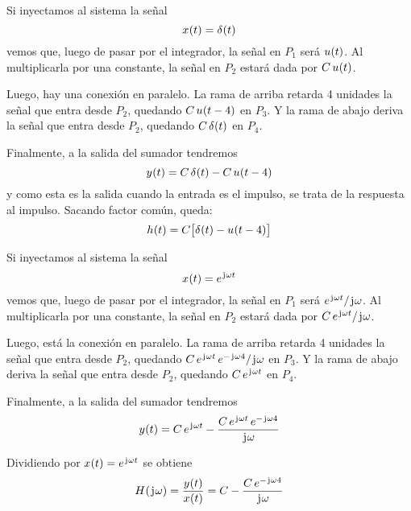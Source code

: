 \begin{mdframed}[style=ExampleFrame]
    \begin{center}
        \def\svgwidth{\linewidth}
        
    \end{center}


    Si inyectamos al sistema la señal
    \[
        \fx[x]{t} = \fx[\delta]{t}
    \]
    vemos que, luego de pasar por el integrador, la señal en $P_1$ será $\fx[u]{t}$.
    Al multiplicarla por una constante, la señal en $P_2$ estará dada por $C \, \fx[u]{t}$.

    Luego, hay una conexión en paralelo.
    La rama de arriba retarda 4 unidades la señal que entra desde $P_2$, quedando $C \, \fx[u]{t-4}$ en $P_3$.
    Y la rama de abajo deriva la señal que entra desde $P_2$, quedando $C \, \fx[\delta]{t}$ en $P_4$.

    Finalmente, a la salida del sumador tendremos
    \[
        \fx[y]{t} = C \, \fx[\delta]{t} - C \, \fx[u]{t-4}
    \]
    y como esta es la salida cuando la entrada es el impulso, se trata de la respuesta al impulso.
    Sacando factor común, queda:
    \[
        \fx[h]{t} = C \inBrackets{\fx[\delta]{t} - \fx[u]{t-4}}
    \]


    Si inyectamos al sistema la señal
    \[
        \fx[x]{t} = \complexExp
    \]
    vemos que, luego de pasar por el integrador, la señal en $P_1$ será $\sfrac{\complexExp}{\iu \omega}$.
    Al multiplicarla por una constante, la señal en $P_2$ estará dada por $\sfrac{C \, \complexExp}{\iu \omega}$.

    Luego, está la conexión en paralelo.
    La rama de arriba retarda 4 unidades la señal que entra desde $P_2$, quedando $\sfrac{C \, \complexExp \, e^{- \iu \omega 4}}{\iu \omega}$ en $P_3$.
    Y la rama de abajo deriva la señal que entra desde $P_2$, quedando $C \, \complexExp$ en $P_4$.

    Finalmente, a la salida del sumador tendremos
    \[
        \fx[y]{t} = C \, \complexExp - \frac{C \, \complexExp \, e^{- \iu \omega 4}}{\iu \omega}
    \]

    Dividiendo por $\fx[x]{t} = \complexExp$ se obtiene
    \[
        \fx[H]{\iu \omega} = \frac{\fx[y]{t}}{\fx[x]{t}} = C - \frac{C \, e^{- \iu \omega 4}}{\iu \omega}
    \]
\end{mdframed}